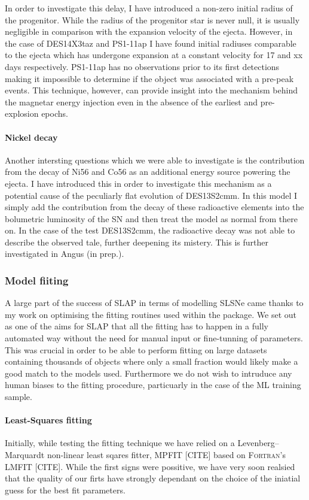 In order to investigate this delay, I have introduced a non-zero initial radius of the progenitor. While the radius of the progenitor star is never null, it is usually negligible in comparison with the expansion velocity of the ejecta. However, in the case of DES14X3taz and PS1-11ap I have found initial radiuses comparable to the ejecta which has undergone expansion at a constant velocity for 17 and xx days respectively. PS1-11ap has no observations prior to its first detections making it impossible to determine if the object was associated with a pre-peak events. This technique, however, can provide insight into the mechanism behind the magnetar energy injection even in the absence of the earliest and pre-explosion epochs.

\paragraph{Nickel decay}
Another intersting questions which we were able to investigate is the contribution from the decay of Ni56 and Co56 as an additional energy source powering the ejecta. I have introduced this in order to investigate this mechanism as a potential cause of the peculiarly flat evolution of DES13S2cmm. In this model I simply add the contribution from the decay of these radioactive elements into the bolumetric luminosity of the SN and then treat the model as normal from there on. In the case of the test DES13S2cmm, the radioactive decay was not able to describe the observed tale, further deepening its mistery. This is further investigated in Angus (in prep.).

\subsubsection{Model fiiting}
A large part of the success of SLAP in terms of modelling SLSNe came thanks to my work on optimising the fitting routines used within the package. We set out as one of the aims for \textsc{SLAP} that all the fitting has to happen in a fully automated way without the need for manual input or fine-tunning of parameters. This was crucial in order to be able to perform fitting on large datasets containing thousands of objects where only a small fraction would likely make a good match to the models used. Furthermore we do not wish to intruduce any human biases to the fitting procedure, particuarly in the case of the ML training sample.

\paragraph{Least-Squares fitting}
Initially, while testing the fitting technique we have relied on a Levenberg–Marquardt non-linear least sqares fitter, \textsc{MPFIT} [CITE] based on \textsc{Fortran}'s \textsc{LMFIT} [CITE]. While the first signs were possitive, we have very soon realsied that the quality of our firts have strongly dependant on the choice of the iniatial guess for the best fit parameters.

